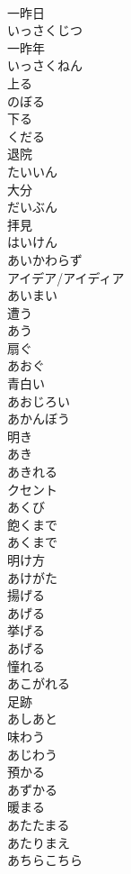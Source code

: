 \documentclass[8pt]{extreport}
\begin{document}
\begin{CJK}{UTF8}{min}
\\	一昨日 
\\	いっさくじつ	
\\	一昨年 
\\	いっさくねん	
\\	上る 
\\	のぼる	
\\	下る 
\\	くだる	
\\	退院 
\\	たいいん	
\\	大分 
\\	だいぶん	
\\	拝見 
\\	はいけん	
\\	あいかわらず	
\\	アイデア/アイディア	
\\	あいまい	
\\	遭う 
\\	あう	
\\	扇ぐ 
\\	あおぐ	
\\	青白い 
\\	あおじろい	
\\	あかんぼう	
\\	明き 
\\	あき	
\\	あきれる	
\\	クセント	
\\	あくび	
\\	飽くまで 
\\	あくまで	
\\	明け方 
\\	あけがた	
\\	揚げる 
\\	あげる	
\\	挙げる 
\\	あげる	
\\	憧れる 
\\	あこがれる	
\\	足跡 
\\	あしあと	
\\	味わう 
\\	あじわう	
\\	預かる 
\\	あずかる	
\\	暖まる 
\\	あたたまる	
\\	あたりまえ	
\\	あちらこちら 

\end{CJK}
\end{document}
